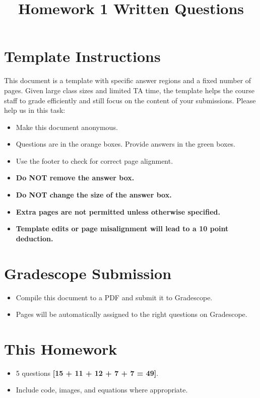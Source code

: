 \documentclass[11pt]{article}
\date{}
\title{\vspace{-1cm}Homework 1 Written Questions}
\begin{document}
\maketitle
\thispagestyle{fancy}

\section*{Template Instructions}

This document is a template with specific answer regions and a fixed number of pages. Given large class sizes and limited TA time, the template helps the course staff to grade efficiently and still focus on the content of your submissions. Please help us in this task:
 
\begin{itemize}
  \item Make this document anonymous.
  
  \item Questions are in the orange boxes. Provide answers in the green boxes.
  \item Use the footer to check for correct page alignment.

  \item \textbf{Do NOT remove the answer box.}
  \item \textbf{Do NOT change the size of the answer box.}
  \item \textbf{Extra pages are not permitted unless otherwise specified.}
  \item \textbf{Template edits or page misalignment will lead to a 10 point deduction.}
\end{itemize}

\section*{Gradescope Submission}
\begin{itemize}
  \item Compile this document to a PDF and submit it to Gradescope.
  \item Pages will be automatically assigned to the right questions on Gradescope.
\end{itemize}

\section*{This Homework}
\begin{itemize}
    \item 5 questions \textbf{[15 + 11 + 12 + 7 + 7 = 49]}.
    \item Include code, images, and equations where appropriate.
\end{itemize}
\end{document}
